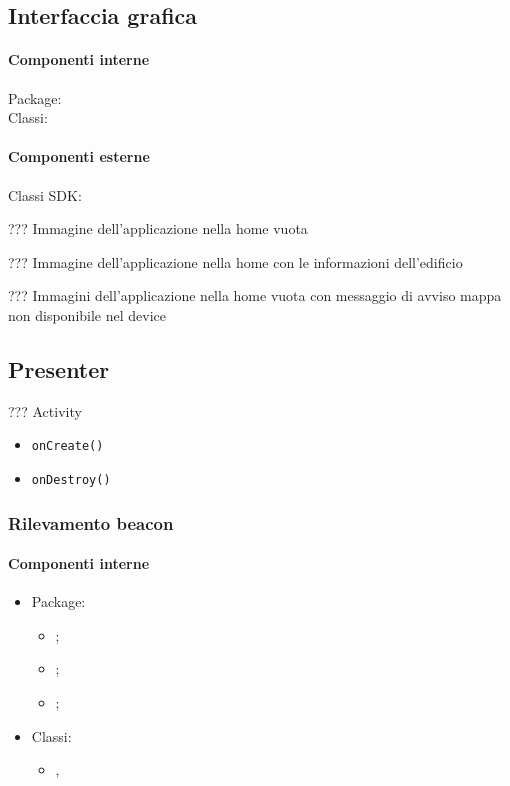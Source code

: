 \documentclass[../Funzionalita.tex]{subfiles}
\begin{document}
		\subsection{Interfaccia grafica}
		
			\paragraph*{Componenti interne}
			\begin{description}
				\item[Package:]
				\item[Classi:]
			\end{description}
			
			\paragraph*{Componenti esterne}
			\begin{description}
				\item[Classi SDK:] 
			\end{description}
			
			??? Immagine dell'applicazione nella home vuota
			
			??? Immagine dell'applicazione nella home con le informazioni dell'edificio
			
			??? Immagini dell'applicazione nella home vuota con messaggio di avviso mappa non disponibile nel device
			
		\subsection{Presenter}
		
			??? Activity
			
			\begin{itemize}[label={-}]
				\item \verb|onCreate()|
				\item \verb|onDestroy()|
			\end{itemize}
			
		\subsubsection{Rilevamento beacon}
			
			\paragraph*{Componenti interne}
			\begin{itemize}
				\item Package:
				\begin{itemize}
					\item \model;
					\item \beacon;
					\item \dataaccess;
				\end{itemize}
				\item Classi: 
				\begin{itemize}
					\item \BeaconManagerAdapter, 
				\end{itemize}								
			\end{itemize}
			
\end{document}
